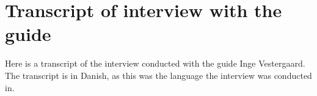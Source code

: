 \chapter{Transcript of interview with the guide}\label{app:transcriptInterview}
Here is a transcript of the interview conducted with the guide Inge Vestergaard. The transcript is in Danish, as this was the language the interview was conducted in. 

